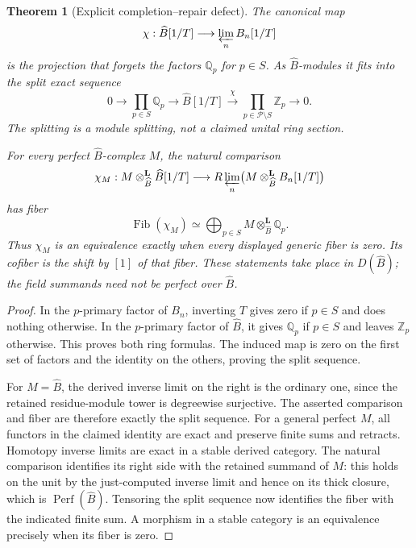 \documentclass[11pt]{article}
\newtheorem{theorem}{Theorem}[section]
\theoremstyle{definition}
\theoremstyle{remark}
\begin{document}
\begin{theorem}[Explicit completion--repair defect]\label{thm:completion-repair-defect}
The canonical map
\[
 \chi:\widehat B[1/T]\longrightarrow\varprojlim_n B_n[1/T]
\]
is the projection that forgets the factors $\mathbb Q_p$ for $p\in S$. As $\widehat B$-modules it fits into the split exact sequence
\[
 0\longrightarrow\prod_{p\in S}\mathbb Q_p
 \longrightarrow\widehat B[1/T]
 \xrightarrow{\chi}\prod_{p\in\mathcal P\setminus S}\mathbb Z_p
 \longrightarrow0.
\]
The splitting is a module splitting, not a claimed unital ring section.

For every perfect $\widehat B$-complex $M$, the natural comparison
\[
 \chi_M:M\otimes^{\mathbf L}_{\widehat B}\widehat B[1/T]
 \longrightarrow R\varprojlim_n
 \bigl(M\otimes^{\mathbf L}_{\widehat B}B_n[1/T]\bigr)
\]
has fiber
\[
 \boxed{\operatorname{Fib}(\chi_M)\simeq
 \bigoplus_{p\in S}M\otimes^{\mathbf L}_{\widehat B}\mathbb Q_p.}
\]
Thus $\chi_M$ is an equivalence exactly when every displayed generic fiber is zero. Its cofiber is the shift by $[1]$ of that fiber. These statements take place in $D(\widehat B)$; the field summands need not be perfect over $\widehat B$.
\end{theorem}
\begin{proof}
In the $p$-primary factor of $B_n$, inverting $T$ gives zero if $p\in S$ and does nothing otherwise. In the $p$-primary factor of $\widehat B$, it gives $\mathbb Q_p$ if $p\in S$ and leaves $\mathbb Z_p$ otherwise. This proves both ring formulas. The induced map is zero on the first set of factors and the identity on the others, proving the split sequence.

For $M=\widehat B$, the derived inverse limit on the right is the ordinary one, since the retained residue-module tower is degreewise surjective. The asserted comparison and fiber are therefore exactly the split sequence. For a general perfect $M$, all functors in the claimed identity are exact and preserve finite sums and retracts. Homotopy inverse limits are exact in a stable derived category. The natural comparison identifies its right side with the retained summand of $M$: this holds on the unit by the just-computed inverse limit and hence on its thick closure, which is $\operatorname{Perf}(\widehat B)$. Tensoring the split sequence now identifies the fiber with the indicated finite sum. A morphism in a stable category is an equivalence precisely when its fiber is zero.
\end{proof}
\end{document}
